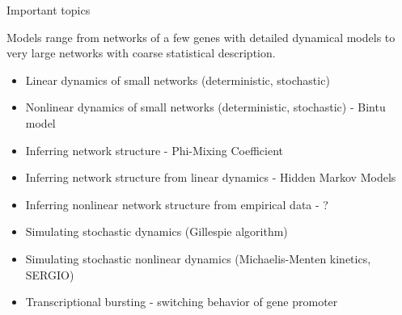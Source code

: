 \documentclass[aspectratio=1610]{beamer}					%
\begin{document}
\begin{frame}{Important topics}

Models range from networks of a few genes with detailed dynamical models to very large networks with coarse statistical description.
\vspace{0.2in}

\begin{itemize}
\item Linear dynamics of small networks (deterministic, stochastic)
\item Nonlinear dynamics of small networks (deterministic, stochastic) - Bintu model
\item Inferring network structure - Phi-Mixing Coefficient
\item Inferring network structure from linear dynamics - Hidden Markov Models
\item Inferring nonlinear network structure from empirical data - ?
\item Simulating stochastic dynamics (Gillespie algorithm)
\item Simulating stochastic nonlinear dynamics (Michaelis-Menten kinetics, SERGIO)
\item Transcriptional bursting - switching behavior of gene promoter
\end{itemize}


\end{frame}
\end{document}
